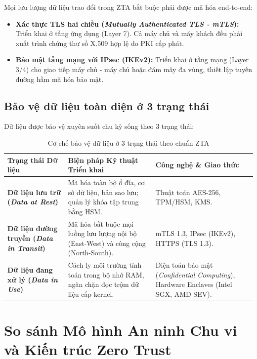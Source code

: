 Mọi lưu lượng dữ liệu trao đổi trong ZTA bắt buộc phải được mã hóa end-to-end:
\begin{itemize}
    \item \textbf{Xác thực TLS hai chiều (\textit{Mutually Authenticated TLS - mTLS}):} Triển khai ở tầng ứng dụng (Layer 7). Cả máy chủ và máy khách đều phải xuất trình chứng thư số X.509 hợp lệ do PKI cấp phát.
    \item \textbf{Bảo mật tầng mạng với IPsec (IKEv2):} Triển khai ở tầng mạng (Layer 3/4) cho giao tiếp máy chủ - máy chủ hoặc đám mây đa vùng, thiết lập tuyến đường hầm mã hóa bảo mật.
\end{itemize}

\subsection{Bảo vệ dữ liệu toàn diện ở 3 trạng thái}
\label{subsec:2_3_4}

Dữ liệu được bảo vệ xuyên suốt chu kỳ sống theo 3 trạng thái:

\begin{table}[htbp]
\centering
\caption{Cơ chế bảo vệ dữ liệu ở 3 trạng thái theo chuẩn ZTA}
\label{tab:data_security_3_states}
\small
\begin{tabular}{|p{3.5cm}|p{5.5cm}|p{5cm}|}
\hline
\textbf{Trạng thái Dữ liệu} & \textbf{Biện pháp Kỹ thuật Triển khai} & \textbf{Công nghệ \& Giao thức} \\ \hline
\textbf{Dữ liệu lưu trữ (\textit{Data at Rest})} & Mã hóa toàn bộ ổ đĩa, cơ sở dữ liệu, bản sao lưu; quản lý khóa tập trung bằng HSM. & Thuật toán AES-256, TPM/HSM, KMS. \\ \hline
\textbf{Dữ liệu đường truyền (\textit{Data in Transit})} & Mã hóa bắt buộc mọi luồng lưu lượng nội bộ (East-West) và công cộng (North-South). & mTLS 1.3, IPsec (IKEv2), HTTPS (TLS 1.3). \\ \hline
\textbf{Dữ liệu đang xử lý (\textit{Data in Use})} & Cách ly môi trường tính toán trong bộ nhớ RAM, ngăn chặn đọc trộm dữ liệu cấp kernel. & Điện toán bảo mật (\textit{Confidential Computing}), Hardware Enclaves (Intel SGX, AMD SEV). \\ \hline
\end{tabular}
\end{table}

\section{So sánh Mô hình An ninh Chu vi và Kiến trúc Zero Trust}
\label{sec:2_4}

